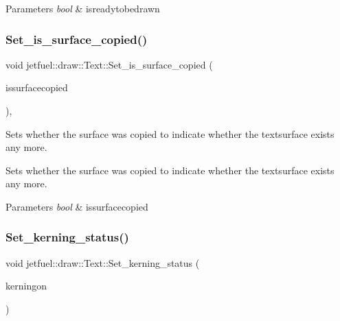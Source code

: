 \begin{DoxyParams}{Parameters}
{\em bool} & isreadytobedrawn \\
\hline
\end{DoxyParams}
\mbox{\label{classjetfuel_1_1draw_1_1Text_ab5b09d74d05260a4f903cb9d780c1948}} 
\subsubsection{\texorpdfstring{Set\+\_\+is\+\_\+surface\+\_\+copied()}{Set\_is\_surface\_copied()}}
{\footnotesize\ttfamily void jetfuel\+::draw\+::\+Text\+::\+Set\+\_\+is\+\_\+surface\+\_\+copied (\begin{DoxyParamCaption}\item[{bool}]{issurfacecopied }\end{DoxyParamCaption})\hspace{0.3cm}{\ttfamily [inline]}, {\ttfamily [protected]}}



Sets whether the surface was copied to indicate whether the textsurface exists any more. 

Sets whether the surface was copied to indicate whether the textsurface exists any more.


\begin{DoxyParams}{Parameters}
{\em bool} & issurfacecopied \\
\hline
\end{DoxyParams}
\mbox{\label{classjetfuel_1_1draw_1_1Text_afdd2ce09d49b3df880939af1a5d5053c}} 
\subsubsection{\texorpdfstring{Set\+\_\+kerning\+\_\+status()}{Set\_kerning\_status()}}
{\footnotesize\ttfamily void jetfuel\+::draw\+::\+Text\+::\+Set\+\_\+kerning\+\_\+status (\begin{DoxyParamCaption}\item[{const bool}]{kerningon }\end{DoxyParamCaption})\hspace{0.3cm}{\ttfamily [inline]}}



